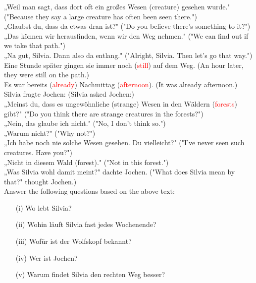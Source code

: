 \documentclass{article}
\begin{document}
„Weil man sagt, dass dort oft ein großes Wesen (creature) gesehen wurde." ("Because they say a large creature has often been seen there.") \\
„Glaubst du, dass da etwas dran ist?" ("Do you believe there's something to it?") \\
„Das können wir herausfinden, wenn wir den Weg nehmen." ("We can find out if we take that path.") \\

„Na gut, Silvia. Dann also da entlang." ("Alright, Silvia. Then let's go that way.") \\
Eine Stunde später gingen sie immer noch (\textcolor{red}{still}) auf dem Weg. (An hour later, they were still on the path.) \\
Es war bereits (\textcolor{red}{already}) Nachmittag (\textcolor{red}{afternoon}). (It was already afternoon.) \\
Silvia fragte Jochen: (Silvia asked Jochen:) \\

„Meinst du, dass es ungewöhnliche (strange) Wesen in den Wäldern (\textcolor{red}{forests}) gibt?" ("Do you think there are strange creatures in the forests?") \\
„Nein, das glaube ich nicht." ("No, I don't think so.") \\
„Warum nicht?" ("Why not?") \\
„Ich habe noch nie solche Wesen gesehen. Du vielleicht?" ("I've never seen such creatures. Have you?") \\
„Nicht in diesem Wald (forest)." ("Not in this forest.") \\

„Was Silvia wohl damit meint?" dachte Jochen. ("What does Silvia mean by that?" thought Jochen.) \\

Answer the following questions based on the above text:
\begin{enumerate}
    \item[(i)] Wo lebt Silvia?
    \item[(ii)] Wohin läuft Silvia fast jedes Wochenende?
    \item[(iii)] Wofür ist der Wolfskopf bekannt?
    \item[(iv)] Wer ist Jochen?
    \item[(v)] Warum findet Silvia den rechten Weg besser?
\end{enumerate}
\end{document}
